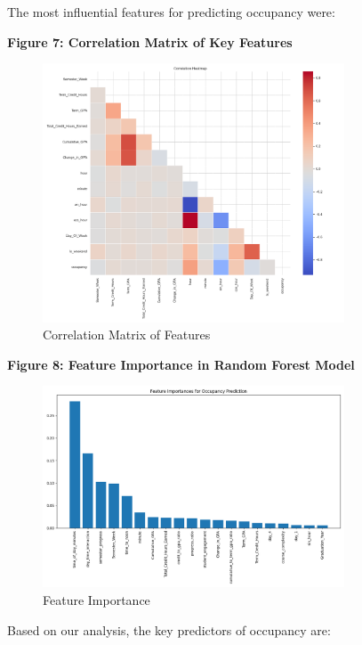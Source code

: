 \documentclass[12pt,letterpaper]{article}
\begin{document}
The most influential features for predicting occupancy were:

\textbf{Figure 7: Correlation Matrix of Key Features}

\begin{figure}[H]
    \centering
    \includegraphics[width=0.8\textwidth]{occupancy_prediction/visualizations/correlation_matrix_occupancy.png}
    \caption{Correlation Matrix of Features}
\end{figure}

\textbf{Figure 8: Feature Importance in Random Forest Model}

\begin{figure}[H]
    \centering
    \includegraphics[width=0.8\textwidth]{occupancy_prediction/visualizations/occupancy_feature_importance.png}
    \caption{Feature Importance}
\end{figure}

Based on our analysis, the key predictors of occupancy are:
\end{document}
